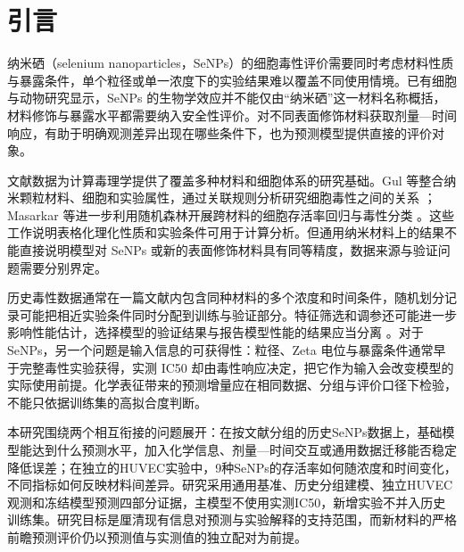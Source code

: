\section{引言}

纳米硒（selenium nanoparticles，SeNPs）的细胞毒性评价需要同时考虑材料性质与暴露条件，单个粒径或单一浓度下的实验结果难以覆盖不同使用情境。已有细胞与动物研究显示，SeNPs 的生物学效应并不能仅由“纳米硒”这一材料名称概括，材料修饰与暴露水平都需要纳入安全性评价\cite{wang2020prooxidation,lunkov2023chitosan}。对不同表面修饰材料获取剂量—时间响应，有助于明确观测差异出现在哪些条件下，也为预测模型提供直接的评价对象。

文献数据为计算毒理学提供了覆盖多种材料和细胞体系的研究基础。Gul 等整合纳米颗粒材料、细胞和实验属性，通过关联规则分析研究细胞毒性之间的关系 \cite{gul2021association}；Masarkar 等进一步利用随机森林开展跨材料的细胞存活率回归与毒性分类 \cite{masarkar2024}。这些工作说明表格化理化性质和实验条件可用于计算分析。但通用纳米材料上的结果不能直接说明模型对 SeNPs 或新的表面修饰材料具有同等精度，数据来源与验证问题需要分别界定。

历史毒性数据通常在一篇文献内包含同种材料的多个浓度和时间条件，随机划分记录可能把相近实验条件同时分配到训练与验证部分。特征筛选和调参还可能进一步影响性能估计，选择模型的验证结果与报告模型性能的结果应当分离 \cite{cawley2010selection}。对于 SeNPs，另一个问题是输入信息的可获得性：粒径、Zeta 电位与暴露条件通常早于完整毒性实验获得，实测 IC50 却由毒性响应决定，把它作为输入会改变模型的实际使用前提。化学表征带来的预测增量应在相同数据、分组与评价口径下检验，不能只依据训练集的高拟合度判断。

本研究围绕两个相互衔接的问题展开：在按文献分组的历史SeNPs数据上，基础模型能达到什么预测水平，加入化学信息、剂量—时间交互或通用数据迁移能否稳定降低误差；在独立的HUVEC实验中，9种SeNPs的存活率如何随浓度和时间变化，不同指标如何反映材料间差异。研究采用通用基准、历史分组建模、独立HUVEC观测和冻结模型预测四部分证据，主模型不使用实测IC50，新增实验不并入历史训练集。研究目标是厘清现有信息对预测与实验解释的支持范围，而新材料的严格前瞻预测评价仍以预测值与实测值的独立配对为前提。
